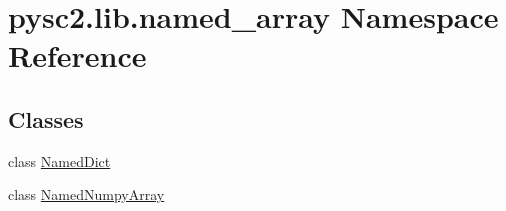 \hypertarget{namespacepysc2_1_1lib_1_1named__array}{}\section{pysc2.\+lib.\+named\+\_\+array Namespace Reference}
\label{namespacepysc2_1_1lib_1_1named__array}
\subsection*{Classes}
\begin{DoxyCompactItemize}
\item 
class \mbox{\hyperlink{classpysc2_1_1lib_1_1named__array_1_1_named_dict}{Named\+Dict}}
\item 
class \mbox{\hyperlink{classpysc2_1_1lib_1_1named__array_1_1_named_numpy_array}{Named\+Numpy\+Array}}
\end{DoxyCompactItemize}
